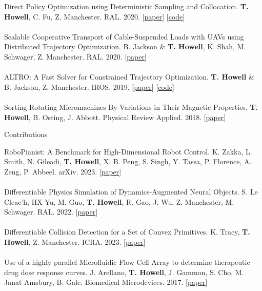 \documentclass[10pt]{article}
\begin{document}
Direct Policy Optimization using Deterministic Sampling and Collocation. \textbf{T. Howell}, C. Fu, Z. Manchester. RAL. 2020. 
[\href{https://arxiv.org/abs/2010.08506v3}{paper}]
[\href{https://github.com/thowell/direct_policy_optimization}{code}]
\\
\\
Scalable Cooperative Transport of Cable-Suspended Loads with UAVs using Distributed Trajectory Optimization. B. Jackson \& \textbf{T. Howell}, K. Shah, M. Schwager, Z. Manchester. RAL. 2020. 
[\href{https://roboticexplorationlab.org/papers/distributed_quads.pdf}{paper}]
\\
\\
ALTRO: A Fast Solver for Constrained Trajectory Optimization. \textbf{T. Howell} \& B. Jackson, Z. Manchester. IROS. 2019. 
[\href{https://roboticexplorationlab.org/papers/altro-iros.pdf}{paper}]
[\href{https://github.com/RoboticExplorationLab/TrajectoryOptimization.jl}{code}]
\\
\\
Sorting Rotating Micromachines By Variations in Their Magnetic Properties. \textbf{T. Howell}, B. Osting, J. Abbott. Physical Review Applied. 2018. 
[\href{https://journals.aps.org/prapplied/pdf/10.1103/PhysRevApplied.9.054021}{paper}]
\\
\begin{center} Contributions \end{center}
RoboPianist: A Benchmark for High-Dimensional Robot Control. K. Zakka, L. Smith, N. Gileadi, \textbf{T. Howell}, X. B. Peng, S. Singh, Y. Tassa, P. Florence, A. Zeng, P. Abbeel. arXiv. 2023. 
[\href{https://arxiv.org/abs/2304.04150}{paper}]
\\
\\
Differentiable Physics Simulation of Dynamics-Augmented Neural Objects. S. Le Cleac'h, HX Yu, M. Guo, \textbf{T. Howell}, R. Gao, J. Wu, Z. Manchester, M. Schwager. RAL. 2022. 
[\href{https://arxiv.org/pdf/2210.09420.pdf}{paper}]
\\
\\
Differentiable Collision Detection for a Set of Convex Primitives. K. Tracy, \textbf{T. Howell}, Z. Manchester. ICRA. 2023.
[\href{https://arxiv.org/abs/2207.00669}{paper}]
\\
\\
Use of a highly parallel Microfluidic Flow Cell Array to determine therapeutic drug dose response curves. J. Arellano, \textbf{T. Howell}, J. Gammon, S. Cho, M. Janat Amsbury, B. Gale. Biomedical Microdevices. 2017. 
[\href{https://link.springer.com/article/10.1007/s10544-017-0166-3}{paper}]
\end{document}
